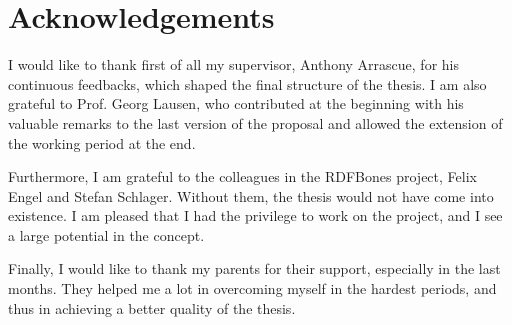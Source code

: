 \newpage
\chapter*{Acknowledgements}

I would like to thank first of all my supervisor, Anthony Arrascue, for his continuous feedbacks, which shaped the final structure of the thesis. I am also grateful to Prof. Georg Lausen, who contributed at the beginning with his valuable remarks to the last version of the proposal and allowed the extension of the working period at the end.

Furthermore, I am grateful to the colleagues in the RDFBones project, Felix Engel and Stefan Schlager. Without them, the thesis would not have come into existence. I am pleased that I had the privilege to work on the project, and I see a large potential in the concept.

Finally, I would like to thank my parents for their support, especially in the last months. They helped me a lot in overcoming myself in the hardest periods, and thus in achieving a better quality of the thesis.
